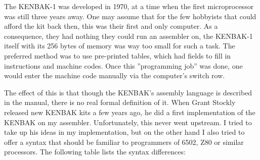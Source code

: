 \documentclass[12pt,twoside]{report}
\begin{document}
The KENBAK-1 was developed in 1970, at a time when the first microprocessor
was still three years away.  One may assume that for the few hobbyists that
could afford the kit back then, this was their first and only computer.  As
a consequence, they had nothing they could run an assembler on, the KENBAK-1 
itself with its 256 bytes of memory was way too small for such a task.  The
preferred method was to use pre-printed tables, which had fields to fill in
instructions and machine codes.  Once this ''programming job'' was done, one
would enter the machine code manually via the computer's switch row.

The effect of this is that though the KENBAK's assembly language is described
in the manual, there is no real formal definition of it.  When Grant Stockly
released new KENBAK kits a few years ago, he did a first implementation of the
KENBAK on my assembler.  Unfortunately, this never went upstream.  I tried
to take up his ideas in my implementation, but on the other hand I also tried to
offer a syntax that should be familiar to programmers of 6502, Z80 or similar
processors.  The following table lists the syntax differences:
\end{document}
